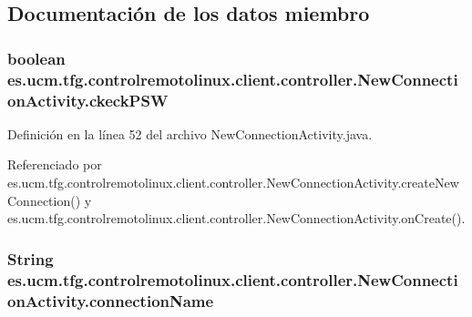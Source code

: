 \subsection{Documentación de los datos miembro}
\hypertarget{classes_1_1ucm_1_1tfg_1_1controlremotolinux_1_1client_1_1controller_1_1NewConnectionActivity_aa1ea973b1f2b0da31f7d62ba058556d1}{
\subsubsection[{ckeck\-P\-S\-W}]{\setlength{\rightskip}{0pt plus 5cm}boolean es.\-ucm.\-tfg.\-controlremotolinux.\-client.\-controller.\-New\-Connection\-Activity.\-ckeck\-P\-S\-W\hspace{0.3cm}{\ttfamily [private]}}}\label{classes_1_1ucm_1_1tfg_1_1controlremotolinux_1_1client_1_1controller_1_1NewConnectionActivity_aa1ea973b1f2b0da31f7d62ba058556d1}


Definición en la línea 52 del archivo New\-Connection\-Activity.\-java.



Referenciado por es.\-ucm.\-tfg.\-controlremotolinux.\-client.\-controller.\-New\-Connection\-Activity.\-create\-New\-Connection() y es.\-ucm.\-tfg.\-controlremotolinux.\-client.\-controller.\-New\-Connection\-Activity.\-on\-Create().

\hypertarget{classes_1_1ucm_1_1tfg_1_1controlremotolinux_1_1client_1_1controller_1_1NewConnectionActivity_a3f3c0694b43f637393da1de941c00fa1}{
\subsubsection[{connection\-Name}]{\setlength{\rightskip}{0pt plus 5cm}String es.\-ucm.\-tfg.\-controlremotolinux.\-client.\-controller.\-New\-Connection\-Activity.\-connection\-Name\hspace{0.3cm}{\ttfamily [private]}}}\label{classes_1_1ucm_1_1tfg_1_1controlremotolinux_1_1client_1_1controller_1_1NewConnectionActivity_a3f3c0694b43f637393da1de941c00fa1}


